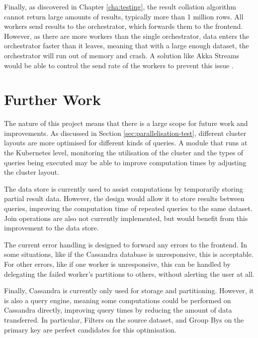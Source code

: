 Finally, as discovered in Chapter \ref{cha:testing}, the result collation algorithm cannot return large amounts of results, typically more than 1 million rows. All workers send results to the orchestrator, which forwards them to the frontend. However, as there are more workers than the single orchestrator, data enters the orchestrator faster than it leaves, meaning that with a large enough dataset, the orchestrator will run out of memory and crash. A solution like Akka Streams would be able to control the send rate of the workers to prevent this issue \cite{akkastreams}.

\section{Further Work}
The nature of this project means that there is a large scope for future work and improvements. As discussed in Section \ref{sec:parallelisation-test}, different cluster layouts are more optimised for different kinds of queries. 
A module that runs at the Kubernetes level, monitoring the utilisation of the cluster and the types of queries being executed may be able to improve computation times by adjusting the cluster layout.

The data store is currently used to assist computations by temporarily storing partial result data. However, the design would allow it to store results between queries, improving the computation time of repeated queries to the same dataset. Join operations are also not currently implemented, but would benefit from this improvement to the data store. 

The current error handling is designed to forward any errors to the frontend. In some situations, like if the Cassandra database is unresponsive, this is acceptable. For other errors, like if one worker is unresponsive, this can be handled by delegating the failed worker's partitions to others, without alerting the user at all.

Finally, Cassandra is currently only used for storage and partitioning. However, it is also a query engine, meaning some computations could be performed on Cassandra directly, improving query times by reducing the amount of data transferred. In particular, Filters on the source dataset, and Group Bys on the primary key are perfect candidates for this optimisation.

